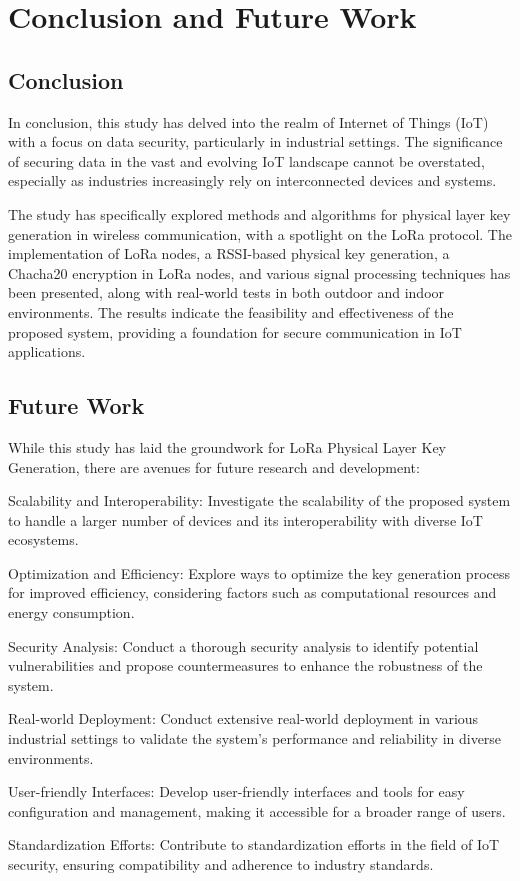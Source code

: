 
\chapter{Conclusion and Future Work}

\section{Conclusion}
In conclusion, this study has delved into the realm of Internet of Things (IoT) with a focus on data security, particularly in industrial settings. The significance of securing data in the vast and evolving IoT landscape cannot be overstated, especially as industries increasingly rely on interconnected devices and systems.

The study has specifically explored methods and algorithms for physical layer key generation in wireless communication, with a spotlight on the LoRa protocol. The implementation of LoRa nodes, a RSSI-based physical key generation, a Chacha20 encryption in LoRa nodes, and various signal processing techniques has been presented, along with real-world tests in both outdoor and indoor environments. The results indicate the feasibility and effectiveness of the proposed system, providing a foundation for secure communication in IoT applications.

\section{Future Work}

While this study has laid the groundwork for LoRa Physical Layer Key Generation, there are avenues for future research and development:

Scalability and Interoperability: Investigate the scalability of the proposed system to handle a larger number of devices and its interoperability with diverse IoT ecosystems.

Optimization and Efficiency: Explore ways to optimize the key generation process for improved efficiency, considering factors such as computational resources and energy consumption.

Security Analysis: Conduct a thorough security analysis to identify potential vulnerabilities and propose countermeasures to enhance the robustness of the system.


Real-world Deployment: Conduct extensive real-world deployment in various industrial settings to validate the system's performance and reliability in diverse environments.

 User-friendly Interfaces: Develop user-friendly interfaces and tools for easy configuration and management, making it accessible for a broader range of users.

Standardization Efforts: Contribute to standardization efforts in the field of IoT security, ensuring compatibility and adherence to industry standards.